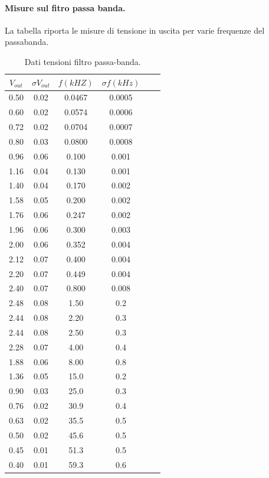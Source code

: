 \documentclass[10pt,a4paper]{article}
\begin{document}
\paragraph{Misure sul fitro passa banda.}
La tabella riporta le misure di tensione in uscita per varie frequenze del passabanda.


\begin{table}[h]
\centering
\begin{tabular}{|c|c|c|c|c|c|}
\hline 
$V_{out}$ & $\sigma V_{out}$ & $f(kHZ)$ & $\sigma f(kHz)$ \\ 
\hline 
0.50 & 0.02 & 0.0467 & 0.0005 \\ 
\hline 
0.60 & 0.02 & 0.0574 & 0.0006 \\ 
\hline 
0.72 & 0.02 & 0.0704 & 0.0007 \\ 
\hline 
0.80 & 0.03 & 0.0800 & 0.0008 \\ 
\hline 
0.96 & 0.06 & 0.100 & 0.001 \\ 
\hline 
1.16 & 0.04 & 0.130 & 0.001 \\ 
\hline 
1.40 & 0.04 & 0.170 & 0.002 \\ 
\hline 
1.58 & 0.05 & 0.200 & 0.002 \\ 
\hline 
1.76 & 0.06 & 0.247 & 0.002 \\ 
\hline 
1.96 & 0.06 & 0.300 & 0.003 \\ 
\hline 
2.00 & 0.06 & 0.352 & 0.004 \\ 
\hline 
2.12 & 0.07 & 0.400 & 0.004 \\ 
\hline 
2.20 & 0.07 & 0.449 & 0.004 \\ 
\hline 
2.40 & 0.07 & 0.800 & 0.008 \\ 
\hline 
2.48 & 0.08 & 1.50 & 0.2 \\ 
\hline 
2.44 & 0.08 & 2.20 & 0.3 \\ 
\hline 
2.44 & 0.08 & 2.50 & 0.3 \\ 
\hline 
2.28 & 0.07 & 4.00 & 0.4 \\ 
\hline 
1.88 & 0.06 & 8.00 & 0.8 \\ 
\hline 
1.36 & 0.05 & 15.0 & 0.2 \\ 
\hline 
0.90 & 0.03 & 25.0 & 0.3 \\ 
\hline 
0.76 & 0.02 & 30.9 & 0.4 \\ 
\hline 
0.63 & 0.02 & 35.5 & 0.5 \\ 
\hline 
0.50 & 0.02 & 45.6 & 0.5 \\ 
\hline 
0.45 & 0.01 & 51.3 & 0.5 \\ 
\hline 
0.40 & 0.01 & 59.3 & 0.6 \\ 
\hline 
\end{tabular} 
\caption{Dati tensioni filtro passa-banda.}
\end{table}
\end{document}
